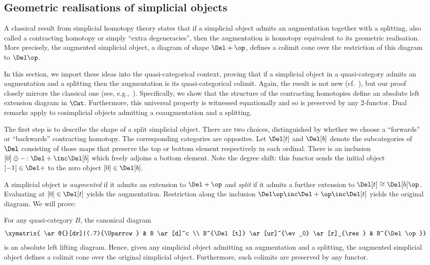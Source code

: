 \subsection{Geometric realisations of simplicial objects}

A classical result from simplicial homotopy theory states that if a simplicial object admits an augmentation together with a splitting, also called a contracting homotopy or simply ``extra degeneracies'', then the augmentation is homotopy equivalent to its geometric realisation. More precisely, the augmented simplicial object, a diagram of shape $\Del+\op$, defines a colimit cone over the restriction of this diagram to $\Del\op$. 

In this section, we import these ideas into the quasi-categorical context, proving that if a simplicial object in a quasi-category admits an augmentation and a splitting then the augmentation is its quasi-categorical colimit.
Again, the result is not new (cf.~\cite[6.1.3.16]{Lurie:2009fk}), but our proof closely mirrors the classical one (see, e.g.,~\cite{Meyer:84ba}). Specifically, we show that the structure of the contracting homotopies define an absolute left extension diagram in $\Cat$. Furthermore, this universal property is witnessed equationally and so is preserved by any 2-functor.  Dual remarks apply to cosimplicial objects admitting a coaugmentation and a splitting.

The first step is to describe the shape of a split simplicial object. There are two choices, distinguished by whether we choose a ``forwards'' or ``backwards'' contracting homotopy. The corresponding categories are opposites. Let $\Del[t]$ and $\Del[b]$ denote the subcategories of $\Del$ consisting of those maps that preserve the top or bottom element respectively in each ordinal. There is an inclusion  $[0]\oplus -\colon \Del+ \inc \Del[b]$ which freely adjoins a bottom element. Note the degree shift: this functor sends the initial object $[-1] \in \Del+$ to the zero object $[0]\in\Del[b]$. 

A simplicial object is \emph{augmented} if it admits an extension to $\Del+\op$ and \emph{split} if it admits a further extension to $\Del[t] \cong \Del[b]\op$. Evaluating at $[0] \in \Del[t]$ yields the augmentation. Restriction along the inclusion $\Del\op \inc \Del+\op\inc \Del[t]$ yields the original diagram. We will prove:

\begin{thm}\label{thm:splitgeorealizations} For any quasi-category $B$, the canonical diagram \[ \xymatrix{ \ar@{}[dr]|(.7){\Uparrow} & B \ar[d]^c \\ B^{\Del[t]} \ar[ur]^{\ev_0} \ar[r]_{\res} & B^{\Del\op}}\] is an absolute left lifting diagram. Hence, given any simplicial object admitting an augmentation and a splitting, the augmented simplicial object defines a colimit cone over the original simplicial object. Furthermore, such colimits are preserved by any functor.
\end{thm}

